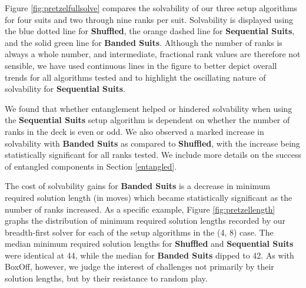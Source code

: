 \documentclass[journal]{IEEEtran}
\begin{document}
Figure \ref{fig:pretzelfullsolve} compares the solvability of our three setup algorithms for four suits and two through nine ranks per suit. Solvability is displayed using the blue dotted line for \textbf{Shuffled}, the orange dashed line for \textbf{Sequential Suits}, and the solid green line for \textbf{Banded Suits}. Although the number of ranks is always a whole number, and intermediate, fractional rank values are therefore not sensible, we have used continuous lines in the figure to better depict overall trends for all algorithms tested and to highlight the oscillating nature of solvability for \textbf{Sequential Suits}.

We found that whether entanglement helped or hindered solvability when using the \textbf{Sequential Suits} setup algorithm is dependent on whether the number of ranks in the deck is even or odd. We also observed a marked increase in solvability with \textbf{Banded Suits} as compared to \textbf{Shuffled}, with the increase being statistically significant for all ranks tested. We include more details on the success of entangled components in Section \ref{entangled}.

The cost of solvability gains for \textbf{Banded Suits} is a decrease in minimum required solution length (in moves) which became statistically significant as the number of ranks increased. As a specific example, Figure \ref{fig:pretzellength} graphs the distribution of minimum required solution lengths recorded by our breadth-first solver for each of the setup algorithms in the (4, 8) case. The median minimum required solution lengths for \textbf{Shuffled} and \textbf{Sequential Suits} were identical at 44, while the median for \textbf{Banded Suits} dipped to 42. As with BoxOff, however, we judge the interest of challenges not primarily by their solution lengths, but by their resistance to random play.


\end{document}
